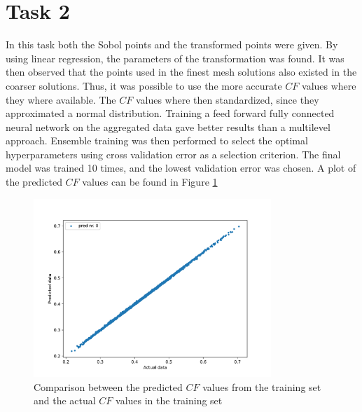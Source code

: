 \documentclass[a4paper]{article}
\begin{document}
\section*{Task 2}
In this task both the Sobol points and the transformed points were given. By using linear regression, the parameters of the transformation was found. It was then observed that the points used in the finest mesh solutions also existed in the coarser solutions. Thus, it was possible to use the more accurate $CF$ values where they where available. The $CF$ values where then standardized, since they approximated a normal distribution. 
Training a feed forward fully connected neural network on the aggregated data gave better results than a multilevel\cite{lye2020multilevel} approach. Ensemble training was then performed to select the optimal hyperparameters using cross validation error as a selection criterion. The final model was trained 10 times, and the lowest validation error was chosen. A plot of the predicted $CF$ values can be found in Figure \ref{fig:task2}  
\begin{figure}[ht]
    \centering
    \includegraphics[width=0.8\textwidth]{figures/task2/final.pdf}
    \caption{Comparison between the predicted $CF$ values from the training set and the actual $CF$ values in the training set}
    \label{fig:task2}
\end{figure}
\end{document}
